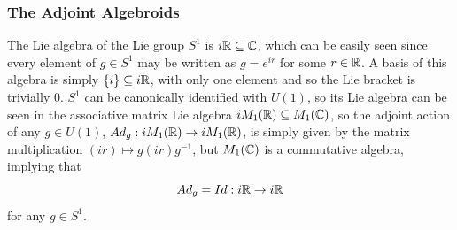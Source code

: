 \subsubsection{The Adjoint Algebroids}

\lin 

The Lie algebra of the Lie group $S^1$ is $i\mathbb{R} \subseteq \mathbb{C}$, which can be easily seen since every element of $g \in S^1$ may be written as $g = e^{i r}$ for some $r \in \mathbb{R}$. A basis of this algebra is simply $\left\{ i \right\} \subseteq i\mathbb{R}$, with only one element and so the Lie bracket is trivially $0$. $S^1$ can be canonically identified with $U(1)$, so its Lie algebra can be seen  in the associative matrix Lie algebra $iM_1(\mathbb{R}) \subseteq M_1(\mathbb{C})$, so the adjoint action of any $g \in U(1)$, $Ad_g: iM_1(\mathbb{R}) \to iM_1(\mathbb{R})$, is simply given by the matrix multiplication $(ir) \mapsto g(ir)g^{-1}$, but $M_1(\mathbb{C})$ is a commutative algebra, implying that \[Ad_g = Id : i\mathbb{R} \to i\mathbb{R}\] for any $g \in S^1$.

\lin

